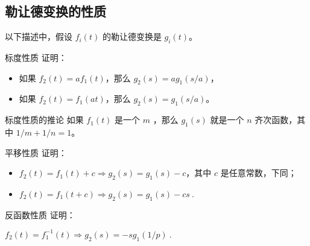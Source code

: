\subsection{勒让德变换的性质}

以下描述中，假设 $f_i(t)$ 的勒让德变换是 $g_i(t)$。

\begin{exercise}{标度性质}
证明：
\begin{itemize}
\item 如果 $f_2(t)=af_1(t)$，那么 $g_2(s)=ag_1(s/a)$，
\item 如果 $f_2(t)=f_1(at)$，那么 $g_2(s)=g_1(s/a)$。
\end{itemize}
\end{exercise}

\begin{corollary}{标度性质的推论}
如果 $f_1(t)$ 是一个 $m$ ，那么 $g_1(s)$ 就是一个 $n$ 齐次函数，其中 $1/m+1/n=1$。
\end{corollary}

\begin{exercise}{平移性质}
证明：
\begin{itemize}
\item $f_2(t)=f_1(t)+c\Rightarrow g_2(s)=g_1(s)-c$，其中 $c$ 是任意常数，下同；
\item $f_2(t)=f_1(t+c)\Rightarrow g_2(s)=g_1(s)-cs~.$
\end{itemize}
\end{exercise}

\begin{exercise}{反函数性质}
证明：

$f_2(t)=f_1^{-1}(t)\Rightarrow g_2(s)=-sg_1(1/p)~.$
\end{exercise}








